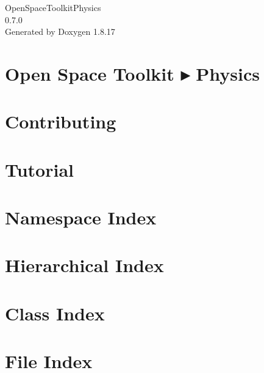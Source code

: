 \let\mypdfximage\pdfximage\def\pdfximage{\immediate\mypdfximage}\documentclass[twoside]{book}
\newcommand{\+}{\discretionary{\mbox{\scriptsize$\hookleftarrow$}}{}{}}
\newcommand{\clearemptydoublepage}{%
  \newpage{\pagestyle{empty}\cleardoublepage}%
}
\begin{document}
\hypersetup{pageanchor=false,
             bookmarksnumbered=true,
             pdfencoding=unicode
            }
\begin{titlepage}
\vspace*{7cm}
\begin{center}%
{\Large Open\+Space\+Toolkit\+Physics \\[1ex]\large 0.\+7.\+0 }\\
\vspace*{1cm}
{\large Generated by Doxygen 1.8.17}\\
\end{center}
\end{titlepage}
\clearemptydoublepage
{}
\tableofcontents
\clearemptydoublepage
{}
\hypersetup{pageanchor=true}

\chapter{Open Space Toolkit ▸ Physics}
\label{index}\hypertarget{index}{}
\chapter{Contributing}
\label{md__c_o_n_t_r_i_b_u_t_i_n_g}

\chapter{Tutorial}
\label{md_docs__tutorial}

\chapter{Namespace Index}

\chapter{Hierarchical Index}

\chapter{Class Index}

\chapter{File Index}

\end{document}
